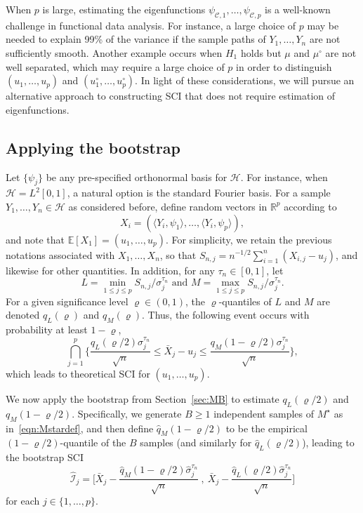 \documentclass[aos,preprint]{imsart}
\numberwithin{equation}{section}
\theoremstyle{plain}
\newcommand{\R}{\mathbb{R}}
\renewcommand{\hat}[1]{\widehat{#1}}
\newcommand{\E}{\mathbb{E}}
\newcommand{\ts}{\textstyle}
\newcommand{\1}{{\bf{1}}}
\newcommand{\0}{\mathbf{0}}
\newcommand{\hilbert}{\mathcal{H}}
\newcommand{\siglevel}{\varrho}
\begin{document}
When $p$ is large, estimating the eigenfunctions $\psi_{\mathcal{C},1},\dots,\psi_{\mathcal{C},p}$ is a well-known challenge in functional data analysis. For instance, a large choice of $p$ may be needed to explain 99\% of the variance if the sample paths of $Y_1,\dots, Y_n$ are not sufficiently smooth. Another example occurs when $H_1$ holds but $\mu$ and $\mu^{\circ}$ are not well separated,
 which may require a large choice of $p$ in order to distinguish $(u_1,\dots,u_p)$ and $(u_1^{\circ},\dots,u_p^{\circ})$. 
In light of these considerations, we will pursue an alternative approach to constructing SCI that does not require estimation of eigenfunctions. 

\subsection{Applying the bootstrap}\label{sec:applyboot} Let $\{\psi_j\}$ be any pre-specified orthonormal basis for $\hilbert$. For instance, when $\hilbert=L^2[0,1]$, a natural option is the standard Fourier basis. For a sample $Y_1,\dots,Y_n\in\hilbert$ as considered before, define random vectors  in $\R^p$ according to
$$X_i=(\langle Y_i,\psi_{1}\rangle,\ldots, \langle Y_i,\psi_{p}\rangle),$$
and note that $\E[X_1]=(u_{1},\ldots,u_{p})$.
For simplicity, we retain the previous notations associated with $X_1,\dots,X_n$, so that $S_{n,j}=n^{-1/2}\sum_{i=1}^{n}(X_{i,j}-u_{j})$, and likewise for other quantities. In addition, for any $\tau_n\in[0,1]$, let
\[
L=\min_{1\leq j\leq p}S_{n,j}/\sigma_{j}^{\tau_{n}} \text{ \ \ \ and \ \ \  }M=\max_{1\leq j\leq p}S_{n,j}/\sigma_{j}^{\tau_{n}}.
\]
For a given significance level $\siglevel \in (0,1)$, the $\siglevel$-quantiles of $L$ and $M$ are denoted $q_L(\siglevel)$ and $q_M(\siglevel)$. Thus, the following event occurs with probability at least $1-\siglevel$,
%
\begin{equation}\label{eq:sci}
\bigcap_{j=1}^{p}\bigg\{ \ts\frac{q_L(\siglevel/2)\sigma_{j}^{\tau_{n}}}{\sqrt{n}}\leq\bar{X}_{j}-u_{j}\leq \ts\frac{q_M(1-\siglevel/2) \sigma_{j}^{\tau_{n}}}{\sqrt{n}}\bigg\}, 
\end{equation}
which leads to theoretical SCI for $(u_1,\dots,u_p)$. 

We now apply the bootstrap from Section~\ref{sec:MB} to estimate $q_L(\siglevel/2)$ and $q_M(1-\siglevel/2)$. Specifically, we generate $B\geq 1$ independent samples of $M^{\star}$ as in~\eqref{eqn:Mstardef}, and then  define $\hat q_M(1-\siglevel/2)$ to be the empirical $(1-\siglevel/2)$-quantile of the $B$ samples (and similarly for $\hat q_L(\siglevel/2)$), leading to the bootstrap SCI 
%
%
%
%
\begin{equation}\label{eqn:SCIdef}
\hat{\mathcal{I}}_j=\bigg[\bar X_j - \ts\frac{\hat q_M(1-\siglevel/2) \hat \sigma_{j}^{\tau_{n}}}{\sqrt{n}}  \ , \ \bar X_j-\ts\frac{\hat q_L(\siglevel/2) \hat \sigma_{j}^{\tau_{n}}}{\sqrt{n}}\bigg]
\end{equation}
for each $j\in\{1,\dots,p\}$.
\end{document}
